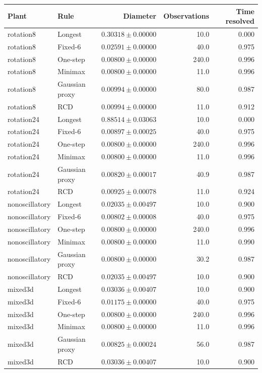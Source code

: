 \begin{tabular}{llrrr}
\toprule
Plant & Rule & Diameter & Observations & Time resolved \\
\midrule
rotation8 & Longest & $0.30318\pm0.00000$ & 10.0 & 0.000 \\
rotation8 & Fixed-6 & $0.02591\pm0.00000$ & 40.0 & 0.975 \\
rotation8 & One-step & $0.00800\pm0.00000$ & 240.0 & 0.996 \\
rotation8 & Minimax & $0.00800\pm0.00000$ & 11.0 & 0.996 \\
rotation8 & Gaussian proxy & $0.00994\pm0.00000$ & 80.0 & 0.987 \\
rotation8 & RCD & $0.00994\pm0.00000$ & 11.0 & 0.912 \\
\midrule
rotation24 & Longest & $0.88514\pm0.03063$ & 10.0 & 0.000 \\
rotation24 & Fixed-6 & $0.00897\pm0.00025$ & 40.0 & 0.975 \\
rotation24 & One-step & $0.00800\pm0.00000$ & 240.0 & 0.996 \\
rotation24 & Minimax & $0.00800\pm0.00000$ & 11.0 & 0.996 \\
rotation24 & Gaussian proxy & $0.00820\pm0.00017$ & 40.9 & 0.987 \\
rotation24 & RCD & $0.00925\pm0.00078$ & 11.0 & 0.924 \\
\midrule
nonoscillatory & Longest & $0.02035\pm0.00497$ & 10.0 & 0.900 \\
nonoscillatory & Fixed-6 & $0.00802\pm0.00008$ & 40.0 & 0.975 \\
nonoscillatory & One-step & $0.00800\pm0.00000$ & 240.0 & 0.996 \\
nonoscillatory & Minimax & $0.00800\pm0.00000$ & 11.0 & 0.990 \\
nonoscillatory & Gaussian proxy & $0.00800\pm0.00000$ & 30.2 & 0.987 \\
nonoscillatory & RCD & $0.02035\pm0.00497$ & 10.0 & 0.900 \\
\midrule
mixed3d & Longest & $0.03036\pm0.00407$ & 10.0 & 0.900 \\
mixed3d & Fixed-6 & $0.01175\pm0.00000$ & 40.0 & 0.975 \\
mixed3d & One-step & $0.00800\pm0.00000$ & 240.0 & 0.996 \\
mixed3d & Minimax & $0.00800\pm0.00000$ & 11.0 & 0.996 \\
mixed3d & Gaussian proxy & $0.00825\pm0.00024$ & 56.0 & 0.987 \\
mixed3d & RCD & $0.03036\pm0.00407$ & 10.0 & 0.900 \\
\bottomrule
\end{tabular}